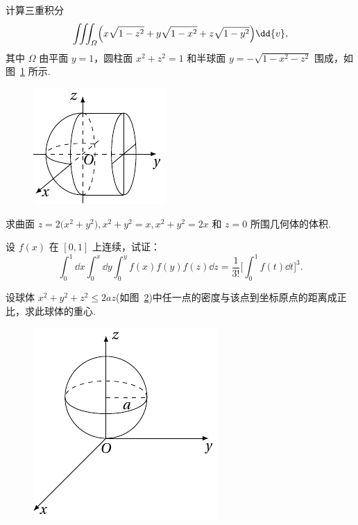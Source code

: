 	\begin{ti}
		计算三重积分
		\[
			\iiint_{\varOmega} \Bigl( x \sqrt{1 - z^{2}} + y \sqrt{1 - x^{2}} + z \sqrt{1 - y^{2}} \Bigr) \dd{v},
		\]
		其中 $\varOmega$ 由平面 $y = 1$，圆柱面 $x^{2} + z^{2} = 1$ 和半球面 $y = -\sqrt{1 - x^{2} - z^{2}}$ 围成，如图~\ref{fig:1.7.1} 所示.
		\begin{figure}[htbp]
			\centering
			\includegraphics[scale=1]{figure/fig1-7-1.pdf}
			\caption{}\label{fig:1.7.1}
		\end{figure}
	\end{ti}

	\begin{ti}
		求曲面 $z = 2 \bigl( x^{2} + y^{2} \bigr), x^{2} + y^{2} = x, x^{2} + y^{2} = 2x$ 和 $z = 0$ 所围几何体的体积.
	\end{ti}

	\begin{ti}
		设 $f(x)$ 在 $[0,1]$ 上连续，试证：
		\[
			\int_{0}^{1} \dd{x} \int_{0}^{x} \dd{y} \int_{0}^{y} f(x) f(y) f(z) \dd{z} = \frac{1}{3!} \Biggl[ \int_{0}^{1} f(t) \dd{t} \Biggr]^{3}.
		\]
	\end{ti}

	\begin{ti}
		设球体 $x^{2} + y^{2} + z^{2} \leq 2az$(如图~\ref{fig:1.7.2})中任一点的密度与该点到坐标原点的距离成正比，求此球体的重心.
		\begin{figure}[htbp]
			\centering
			\includegraphics[scale=1]{figure/fig1-7-2.pdf}
			\caption{}\label{fig:1.7.2}
		\end{figure}
	\end{ti}

